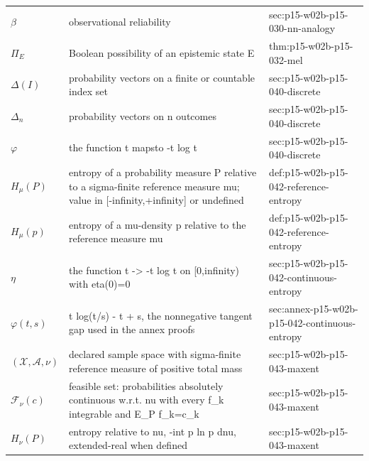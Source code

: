 \begin{longtable}{@{}p{}p{}p{}@{}}
\(\beta\) & observational reliability & sec:\allowbreak{}p15-\allowbreak{}w02b-\allowbreak{}p15-\allowbreak{}030-\allowbreak{}nn-\allowbreak{}analogy \\
\(\Pi_E\) & Boolean possibility of an epistemic state E & thm:\allowbreak{}p15-\allowbreak{}w02b-\allowbreak{}p15-\allowbreak{}032-\allowbreak{}mel \\
\(\Delta(I)\) & probability vectors on a finite or countable index set & sec:\allowbreak{}p15-\allowbreak{}w02b-\allowbreak{}p15-\allowbreak{}040-\allowbreak{}discrete \\
\(\Delta_n\) & probability vectors on n outcomes & sec:\allowbreak{}p15-\allowbreak{}w02b-\allowbreak{}p15-\allowbreak{}040-\allowbreak{}discrete \\
\(\varphi\) & the function t mapsto -t log t & sec:\allowbreak{}p15-\allowbreak{}w02b-\allowbreak{}p15-\allowbreak{}040-\allowbreak{}discrete \\
\(H_\mu(P)\) & entropy of a probability measure P relative to a sigma-finite reference measure mu; value in [-infinity,+infinity] or undefined & def:\allowbreak{}p15-\allowbreak{}w02b-\allowbreak{}p15-\allowbreak{}042-\allowbreak{}reference-\allowbreak{}entropy \\
\(H_\mu(p)\) & entropy of a mu-density p relative to the reference measure mu & def:\allowbreak{}p15-\allowbreak{}w02b-\allowbreak{}p15-\allowbreak{}042-\allowbreak{}reference-\allowbreak{}entropy \\
\(\eta\) & the function t -> -t log t on [0,infinity) with eta(0)=0 & sec:\allowbreak{}p15-\allowbreak{}w02b-\allowbreak{}p15-\allowbreak{}042-\allowbreak{}continuous-\allowbreak{}entropy \\
\(\varphi(t,\allowbreak s)\) & t log(t/s) - t + s, the nonnegative tangent gap used in the annex proofs & sec:\allowbreak{}annex-\allowbreak{}p15-\allowbreak{}w02b-\allowbreak{}p15-\allowbreak{}042-\allowbreak{}continuous-\allowbreak{}entropy \\
\((\mathcal X,\allowbreak \mathcal A,\allowbreak \nu)\) & declared sample space with sigma-finite reference measure of positive total mass & sec:\allowbreak{}p15-\allowbreak{}w02b-\allowbreak{}p15-\allowbreak{}043-\allowbreak{}maxent \\
\(\mathcal F_\nu(c)\) & feasible set: probabilities absolutely continuous w.r.t. nu with every f\_k integrable and E\_P f\_k=c\_k & sec:\allowbreak{}p15-\allowbreak{}w02b-\allowbreak{}p15-\allowbreak{}043-\allowbreak{}maxent \\
\(H_\nu(P)\) & entropy relative to nu, -int p ln p dnu, extended-real when defined & sec:\allowbreak{}p15-\allowbreak{}w02b-\allowbreak{}p15-\allowbreak{}043-\allowbreak{}maxent \\

\end{longtable}
